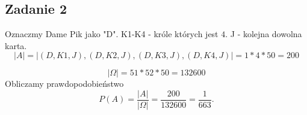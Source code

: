\subsection{Zadanie 2}

Oznaczmy Dame Pik jako "D".
K1-K4 - króle których jest $4$.
J - kolejna dowolna karta.
$$
|A|= |{(D,K1,J), (D,K2,J), (D,K3,J), (D,K4,J)}| = 1 * 4 * 50 = 200
$$

$$
|\Omega| = 51*52*50 = 132600
$$
Obliczamy prawdopodobieństwo
$$
P(A)=\frac{|A|}{|\Omega|}=\frac{200}{132600}=\frac{1}{663}.
$$


